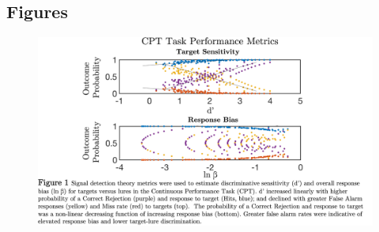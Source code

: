 \documentclass[utf8]{frontiersSCNS} %
\begin{document}
\subsection{Figures}

\newpage

\begin{figure}[h!]
\includegraphics[width=\textwidth,height=\textheight,keepaspectratio]{Fig-1}
\caption{}
\label{fig:1}
\end{figure}
\end{document}
